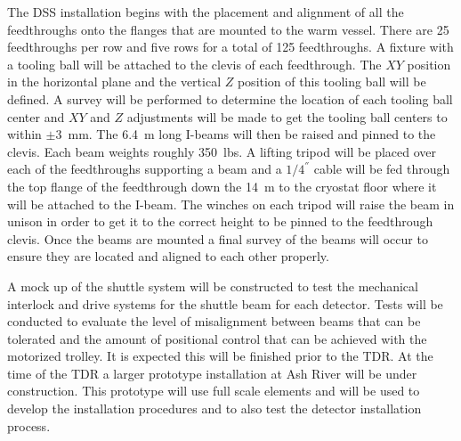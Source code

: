The DSS installation begins with the placement and alignment of all
the feedthroughs onto the flanges that are mounted to the warm vessel.
There are \num{25} feedthroughs per row and five rows for a total of \num{125}
feedthroughs.  A fixture with a tooling ball will be attached to the
clevis of each feedthrough.  The $XY$ position in the horizontal plane
and the vertical $Z$ position of this tooling ball will be defined.  A
survey will be performed to determine the location of each tooling
ball center and $XY$ and $Z$ adjustments will be made to get the tooling
ball centers to within $\pm$\SI{3}{mm}.  The \SI{6.4}{m} long I-beams will then be
raised and pinned to the clevis.  Each beam weights roughly 350~lbs.
A lifting tripod will be placed over each of the feedthroughs
supporting a beam and a $1/4 ^{''}$ cable will be fed through the top
flange of the feedthrough down the \SI{14}{m} to the cryostat floor where it
will be attached to the I-beam.  The winches on each tripod will raise
the beam in unison in order to get it to the correct height to be
pinned to the feedthrough clevis.  Once the beams are mounted a final
survey of the beams will occur to ensure they are located and aligned
to each other properly.

A mock up of the shuttle system will be constructed to test the
mechanical interlock and drive systems for the shuttle beam
for each detector.  Tests will be conducted to evaluate the level of
misalignment between beams that can be tolerated and the amount of
positional control that can be achieved with the motorized trolley. It
is expected this will be finished prior to the TDR. At the time of the
TDR a larger prototype installation at Ash River will be under
construction. This prototype will use full scale elements and will be
used to develop the installation procedures and to also test the
detector installation process.


